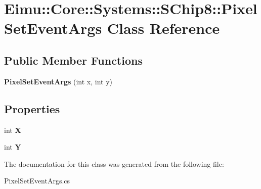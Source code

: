 \hypertarget{class_eimu_1_1_core_1_1_systems_1_1_s_chip8_1_1_pixel_set_event_args}{
\section{Eimu::Core::Systems::SChip8::PixelSetEventArgs Class Reference}
\label{class_eimu_1_1_core_1_1_systems_1_1_s_chip8_1_1_pixel_set_event_args}
}
\subsection*{Public Member Functions}
\begin{DoxyCompactItemize}
\item 
\hypertarget{class_eimu_1_1_core_1_1_systems_1_1_s_chip8_1_1_pixel_set_event_args_a14b57488b8b8ed4e3079f85b27b1f778}{
{\bfseries PixelSetEventArgs} (int x, int y)}
\label{class_eimu_1_1_core_1_1_systems_1_1_s_chip8_1_1_pixel_set_event_args_a14b57488b8b8ed4e3079f85b27b1f778}

\end{DoxyCompactItemize}
\subsection*{Properties}
\begin{DoxyCompactItemize}
\item 
\hypertarget{class_eimu_1_1_core_1_1_systems_1_1_s_chip8_1_1_pixel_set_event_args_afca619220bb8ef0369da5d26b336b94a}{
int {\bfseries X}}
\label{class_eimu_1_1_core_1_1_systems_1_1_s_chip8_1_1_pixel_set_event_args_afca619220bb8ef0369da5d26b336b94a}

\item 
\hypertarget{class_eimu_1_1_core_1_1_systems_1_1_s_chip8_1_1_pixel_set_event_args_af71c4fe6848bba0f9321a4babab8a531}{
int {\bfseries Y}}
\label{class_eimu_1_1_core_1_1_systems_1_1_s_chip8_1_1_pixel_set_event_args_af71c4fe6848bba0f9321a4babab8a531}

\end{DoxyCompactItemize}


The documentation for this class was generated from the following file:\begin{DoxyCompactItemize}
\item 
PixelSetEventArgs.cs\end{DoxyCompactItemize}
